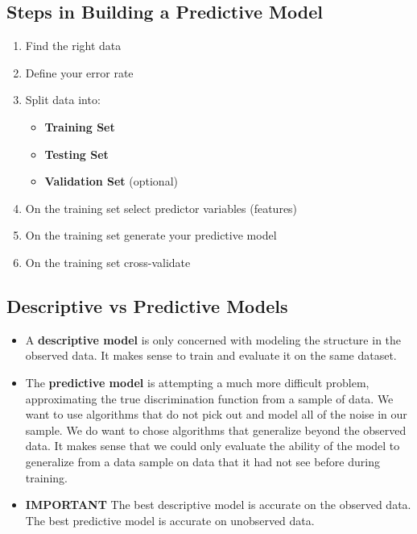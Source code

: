 \documentclass[]{report}
\begin{document}
\subsection{Steps in Building a Predictive Model}
\begin{enumerate}
\item Find the right data
\item Define your error rate
\item Split data into:
\begin{itemize}
\item \textbf{Training Set}
\item \textbf{Testing Set}
\item \textbf{Validation Set} (optional)
\end{itemize}
\item On the training set select predictor variables (features)
\item On the training set generate your predictive model
\item On the training set cross-validate

\end{enumerate}
\subsection{Descriptive vs Predictive Models}

\begin{itemize}
	\item A \textbf{descriptive model} is only concerned with modeling the structure in the observed data. It makes sense to train and evaluate it on the same dataset.
	
	\item The \textbf{predictive model} is attempting a much more difficult problem, approximating the true discrimination function from a sample of data. We want to use algorithms that do not pick out and model all of the noise in our sample. We do want to chose algorithms that generalize beyond the observed data. It makes sense that we could only evaluate the ability of the model to generalize from a data sample on data that it had not see before during training.
	
	\item \textbf{IMPORTANT} The best descriptive model is accurate on the observed data. The best predictive model is accurate on unobserved data.
\end{itemize}
\end{document}
